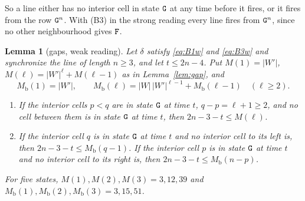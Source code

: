 \documentclass[11pt]{article}
\newtheorem{lemma}{Lemma}
\theoremstyle{remark}
\begin{document}
So a line either has no interior cell in state $\mathtt{G}$ at any time before it fires, or it fires from the
row $\mathtt{G}^n$. With (B3) in the strong reading every line fires from $\mathtt{G}^n$, since no other neighbourhood
gives $\mathtt{F}$.

\begin{lemma}[gaps, weak reading]\label{lem:gapweak}
Let $\delta$ satisfy \eqref{eq:B1w} and \eqref{eq:B3w} and synchronize the line of length $n\ge3$, and let
$t\le2n-4$. Put $M(1)=|W'|$, $M(\ell)=|W'|^{\ell}+M(\ell-1)$ as in Lemma~\ref{lem:gap}, and
\[
M_{\mathrm b}(1)=|W'|,\qquad M_{\mathrm b}(\ell)=|W|\,|W'|^{\ell-1}+M_{\mathrm b}(\ell-1)\quad(\ell\ge2).
\]
\begin{enumerate}[label=\textup{(\arabic*)},nosep]
\item If the interior cells $p<q$ are in state $\mathtt{G}$ at time $t$, $q-p=\ell+1\ge2$, and no cell between them
is in state $\mathtt{G}$ at time $t$, then $2n-3-t\le M(\ell)$.
\item If the interior cell $q$ is in state $\mathtt{G}$ at time $t$ and no interior cell to its left is, then
$2n-3-t\le M_{\mathrm b}(q-1)$. If the interior cell $p$ is in state $\mathtt{G}$ at time $t$ and no interior cell
to its right is, then $2n-3-t\le M_{\mathrm b}(n-p)$.
\end{enumerate}
For five states, $M(1),M(2),M(3)=3,12,39$ and $M_{\mathrm b}(1),M_{\mathrm b}(2),M_{\mathrm b}(3)=3,15,51$.
\end{lemma}
\end{document}
